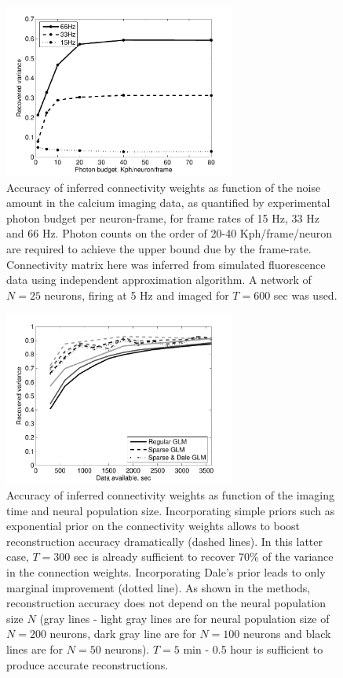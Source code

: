 \begin{figure}[h]
\centering
\includegraphics[width=3in]{../figs/FigureA6_recvar_SNR}
\caption{Accuracy of inferred connectivity weights as function of the noise amount in the calcium imaging data, as quantified by experimental photon budget per neuron-frame, for frame rates of 15 Hz, 33 Hz and 66 Hz. Photon counts on the order of 20-40 Kph/frame/neuron are required to achieve the upper bound due by the frame-rate. Connectivity matrix here was inferred from simulated fluorescence data using independent approximation algorithm. A network of $N=25$ neurons, firing at 5 Hz and imaged for $T=600$ sec was used.}
\label{fig:recvar-SNR}
\end{figure}

\begin{figure}[h]
\centering
\includegraphics[width=3in]{../figs/FigureA7_recvar_NT}
\caption{Accuracy of inferred connectivity weights as function of the imaging time and neural population size. 
Incorporating simple priors such as exponential prior on the connectivity weights allows to boost reconstruction accuracy dramatically (dashed lines). In this latter case, $T=300$ sec is already sufficient to recover 70\% of the variance in the connection weights. Incorporating Dale's prior leads to only marginal improvement (dotted line). As shown in the methods, reconstruction accuracy does not depend on the neural population size $N$ (gray lines - light gray lines are for neural population size of $N=200$ neurons, dark gray line are for $N=100$ neurons and black lines are for $N=50$ neurons).
$T=5$ min - 0.5 hour is sufficient to produce accurate reconstructions.
}
\label{fig:recvar-NT}
\end{figure}


